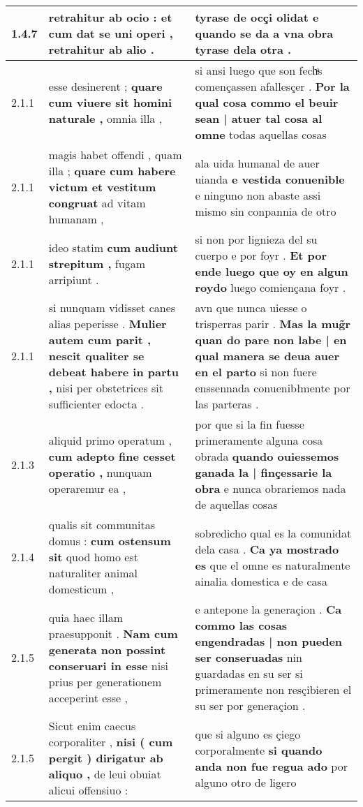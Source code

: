 \begin{tabular}{|p{1cm}|p{6.5cm}|p{6.5cm}|}
1.4.7 & retrahitur ab ocio : \textbf{ et cum dat se uni operi , } retrahitur ab alio . & tyrase de ocçi olidat \textbf{ e quando se da a vna obra } tyrase dela otra . \\\hline
2.1.1 & esse desinerent ; \textbf{ quare cum viuere sit homini naturale , } omnia illa , & si ansi luego que son fechͣs començassen afallesçer . \textbf{ Por la qual cosa commo el beuir sean | atuer tal cosa al omne } todas aquellas cosas \\\hline
2.1.1 & magis habet offendi , quam illa ; \textbf{ quare cum habere victum et vestitum congruat } ad vitam humanam , & ala uida humanal de auer uianda \textbf{ e vestida conuenible } e ninguno non abaste assi mismo sin conpannia de otro \\\hline
2.1.1 & ideo statim \textbf{ cum audiunt strepitum , } fugam arripiunt . & si non por lignieza del su cuerpo e por foyr . \textbf{ Et por ende luego que oy en algun roydo } luego comiençana foyr . \\\hline
2.1.1 & si nunquam vidisset canes alias peperisse . \textbf{ Mulier autem cum parit , nescit qualiter se debeat habere in partu , } nisi per obstetrices sit sufficienter edocta . & avn que nunca uiesse o trisperras parir . \textbf{ Mas la mug̃r quan do pare non labe | en qual manera se deua auer en el parto } si non fuere enssennada conuenibłmente por las parteras . \\\hline
2.1.3 & aliquid primo operatum , \textbf{ cum adepto fine cesset operatio , } nunquam operaremur ea , & por que si la fin fuesse primeramente alguna cosa obrada \textbf{ quando ouiessemos ganada la | finçessarie la obra } e nunca obrariemos nada de aquellas cosas \\\hline
2.1.4 & qualis sit communitas domus : \textbf{ cum ostensum sit } quod homo est naturaliter animal domesticum , & sobredicho qual es la comunidat dela casa . \textbf{ Ca ya mostrado es } que el omne es naturalmente ainalia domestica e de casa \\\hline
2.1.5 & quia haec illam praesupponit . \textbf{ Nam cum generata non possint conseruari in esse } nisi prius per generationem acceperint esse , & e antepone la generaçion . \textbf{ Ca commo las cosas engendradas | non pueden ser conseruadas } nin guardadas en su ser si primeramente non resçibieren el su ser por generaçion . \\\hline
2.1.5 & Sicut enim caecus corporaliter , \textbf{ nisi ( cum pergit ) dirigatur ab aliquo , } de leui obuiat alicui offensiuo : & que si alguno es çiego corporalmente \textbf{ si quando anda non fue regua ado } por alguno otro de ligero \\\hline

\end{tabular}
